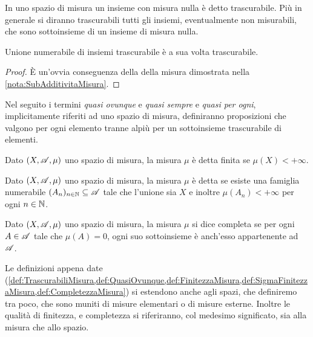 \begin{definition}\label{def:TrascurabiliMisura}
	In uno spazio di misura un insieme con misura nulla è detto trascurabile.
	Più in generale si diranno trascurabili tutti gli insiemi, eventualmente non misurabili, che sono sottoinsieme di un insieme di misura nulla.
\end{definition}
\begin{remark}\label{nota:UnioneTrascurabili}
	Unione numerabile di insiemi trascurabile è a sua volta trascurabile.
\end{remark}
\begin{proof}
	È un'ovvia conseguenza della \sigsubadd[ità] della misura dimostrata nella \cref{nota:SubAdditivitaMisura}.
\end{proof}

\begin{definition}\label{def:QuasiOvunque}
	Nel seguito i termini \emph{quasi ovunque} e \emph{quasi sempre} e \emph{quasi per ogni}, implicitamente riferiti ad uno spazio di misura, definiranno proposizioni che valgono per ogni elemento tranne alpiù per un sottoinsieme trascurabile di elementi.
\end{definition}


\begin{definition}\label{def:FinitezzaMisura}
	Dato $(X,\mathscr A,\mu)$ uno spazio di misura, la misura $\mu$ è detta finita se $\mu(X)<+\infty$.
\end{definition}

\begin{definition}\label{def:SigmaFinitezzaMisura}
	Dato $(X,\mathscr A,\mu)$ uno spazio di misura, la misura $\mu$ è detta \sigfin{} se esiste una famiglia numerabile $(A_n)_{n\in\mathbb N}\subseteq \mathscr A$ tale che l'unione sia $X$ e inoltre $\mu(A_n)<+\infty$ per ogni $n\in\mathbb N$.
\end{definition}

\begin{definition}\label{def:CompletezzaMisura}
	Dato $(X,\mathscr A,\mu)$ uno spazio di misura, la misura $\mu$ si dice completa se per ogni $A\in\mathscr A$ tale che $\mu(A)=0$, ogni suo sottoinsieme è anch'esso appartenente ad $\mathscr A$.
\end{definition}

\begin{remark}
	Le definizioni appena date (\cref{def:TrascurabiliMisura,def:QuasiOvunque,def:FinitezzaMisura,def:SigmaFinitezzaMisura,def:CompletezzaMisura}) si estendono anche agli spazi, che definiremo tra poco, che sono muniti di misure elementari o di misure esterne. Inoltre le qualità di finitezza, \sigfin[ezza] e completezza si riferiranno, col medesimo significato, sia alla misura che allo spazio. 
\end{remark}

